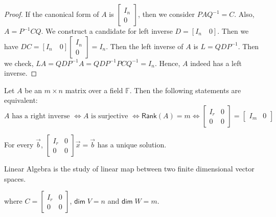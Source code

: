 \documentclass[
	11pt, %
	fleqn, %
	a4paper, %
]{LegrandOrangeBook}
\newcommand{\F}{\mathbb{F}} %
\newcommand{\rank}[1]{\mathsf{Rank}(#1)} %
\newcommand{\B}{\mathcal{B}} %
\renewcommand{\dim}{\mathsf{dim\;}} %
\begin{document}
\begin{proof}
    If the canonical form of $A$ is $\begin{bmatrix}
        I_n \\
        0
    \end{bmatrix}$, then we consider $PAQ^{-1} = C$. Also, $A = P^{-1}CQ$. We construct a candidate for left inverse $D = [I_n \quad 0]$. Then we have $DC = [I_n \quad 0] \begin{bmatrix}
        I_n \\
        0
    \end{bmatrix} = I_n$. Then the left inverse of $A$ is $L = QDP^{-1}$. Then we check, $LA = QDP^{-1}A = QDP^{-1}PCQ^{-1} = I_n$. Hence, $A$ indeed has a left inverse.
\end{proof}

\begin{proposition}
    Let $A$ be an $m \times n$ matrix over a field $\F$. Then the following statements are equivalent:
    \[
        A \text{ has a right inverse } \iff A \text{ is surjective } \iff \rank{A} = m \iff \begin{bmatrix}
            I_r & 0 \\
            0 & 0
        \end{bmatrix} = \begin{bmatrix}
            I_m & 0
        \end{bmatrix}
    \]
\end{proposition}

\begin{proposition}
    For every $\vec{b}$, $\begin{bmatrix}
        I_r & 0 \\
        0 & 0
    \end{bmatrix} \vec{x} = \vec{b}$ has a unique solution.
\end{proposition}

Linear Algebra is the study of linear map between two finite dimensional vector spaces.

\begin{center}
\end{center}
where $C = \begin{bmatrix}
    I_r & 0 \\
    0 & 0
\end{bmatrix}$, $\dim V = n$ and $\dim W = m$.
\end{document}
